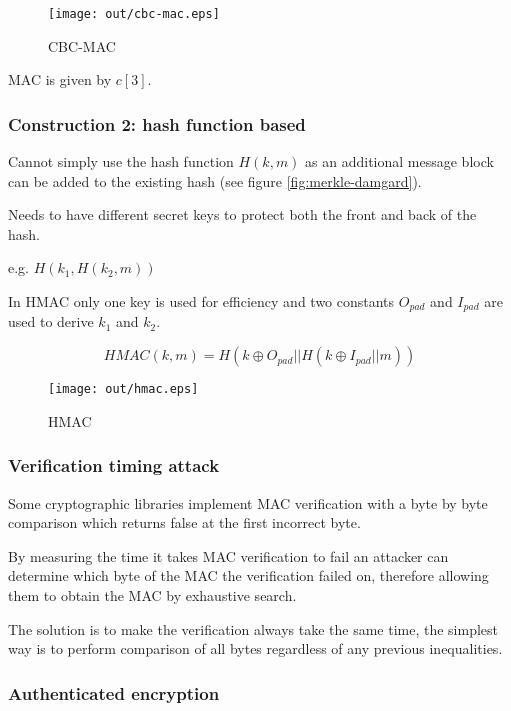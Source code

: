 \documentclass[a4paper]{article}
\begin{document}
\begin{figure}[h!]
  \centering
  \texttt{[image: out/cbc-mac.eps]}
  \caption{CBC-MAC}
  \label{fig:cbc-mac}
\end{figure}
\FloatBarrier

MAC is given by $c[3]$.

\subsubsection{Construction 2: hash function based}

Cannot simply use the hash function $H(k, m)$ as an additional message block can
be added to the existing hash (see figure \ref{fig:merkle-damgard}).


Needs to have different secret keys to protect both the front and back of the
hash.

e.g. $H(k_{1}, H(k_{2}, m))$

In HMAC only one key is used for efficiency and two constants $O_{pad}$ and
$I_{pad}$ are used to derive $k_{1}$ and $k_{2}$.

\[
  HMAC(k, m) = H(k \oplus O_{pad} || H(k \oplus I_{pad} || m))
\]

\begin{figure}[h!]
  \centering
  \texttt{[image: out/hmac.eps]}
  \caption{HMAC}
  \label{fig:hmac}
\end{figure}
\FloatBarrier

\subsubsection{Verification timing attack}

Some cryptographic libraries implement MAC verification with a byte by byte
comparison which returns false at the first incorrect byte.

By measuring the time it takes MAC verification to fail an attacker can
determine which byte of the MAC the verification failed on, therefore allowing
them to obtain the MAC by exhaustive search.

The solution is to make the verification always take the same time, the simplest
way is to perform comparison of all bytes regardless of any previous
inequalities.

\subsubsection{Authenticated encryption}
\end{document}
